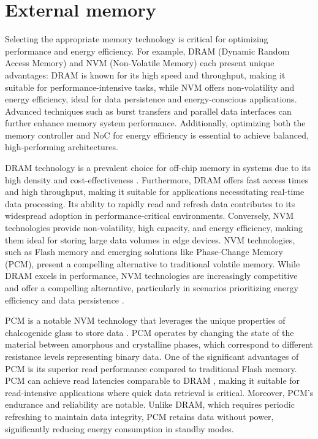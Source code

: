 \section{External memory}
Selecting the appropriate memory technology is critical for optimizing performance and energy efficiency.
For example, DRAM (Dynamic Random Access Memory) and NVM (Non-Volatile Memory) each present unique advantages: DRAM is known for its high speed and throughput, making it suitable for performance-intensive tasks, while NVM offers non-volatility and energy efficiency, ideal for data persistence and energy-conscious applications.
Advanced techniques such as burst transfers and parallel data interfaces can further enhance memory system performance.
Additionally, optimizing both the memory controller and NoC for energy efficiency is essential to achieve balanced, high-performing architectures.

DRAM technology is a prevalent choice for off-chip memory in systems due to its high density and cost-effectiveness \cite{oExploringEnergyefficientDRAM2011}.
Furthermore, DRAM offers fast access times and high throughput, making it suitable for applications necessitating real-time data processing.
Its ability to rapidly read and refresh data contributes to its widespread adoption in performance-critical environments.
Conversely, NVM technologies provide non-volatility, high capacity, and energy efficiency, making them ideal for storing large data volumes in edge devices.
NVM technologies, such as Flash memory and emerging solutions like Phase-Change Memory (PCM), present a compelling alternative to traditional volatile memory.
While DRAM excels in performance, NVM technologies are increasingly competitive and offer a compelling alternative, particularly in scenarios prioritizing energy efficiency and data persistence \cite{dulloorSystemSoftwarePersistent2014}.

PCM is a notable NVM technology that leverages the unique properties of chalcogenide glass to store data \cite{meenaOverviewEmergingNonvolatile2014}.
PCM operates by changing the state of the material between amorphous and crystalline phases, which correspond to different resistance levels representing binary data.
One of the significant advantages of PCM is its superior read performance compared to traditional Flash memory.
PCM can achieve read latencies comparable to DRAM \cite{wangExploringHybridMemory2013}, making it suitable for read-intensive applications where quick data retrieval is critical.
Moreover, PCM's endurance and reliability are notable.
Unlike DRAM, which requires periodic refreshing to maintain data integrity, PCM retains data without power, significantly reducing energy consumption in standby modes.


